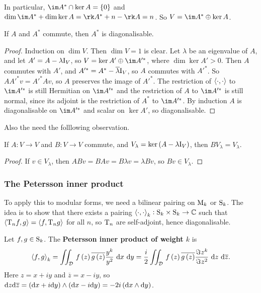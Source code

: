 In particular, $ \im A^* \cap \ker A = \cbr{0} $ and $ \dim \im A^* + \dim \ker A = \rk A^* + n - \rk A = n $. So $ V = \im A^* \oplus \ker A $.

\begin{theorem}
If $ A $ and $ A^* $ commute, then $ A^* $ is diagonalisable.
\end{theorem}

\begin{proof}
Induction on $ \dim V $. Then $ \dim V = 1 $ is clear. Let $ \lambda $ be an eigenvalue of $ A $, and let $ A' = A - \lambda\I_V $, so $ V = \ker A' \oplus \im A'^* $, where $ \dim \ker A' > 0 $. Then $ A $ commutes with $ A' $, and $ A'^* = A^* - \overline{\lambda} \I_V $, so $ A $ commutes with $ A'^* $. So $ AA'^*v = A'^*Av $, so $ A $ preserves the image of $ A'^* $. The restriction of $ \abr{\cdot, \cdot} $ to $ \im A'^* $ is still Hermitian on $ \im A'^* $ and the restriction of $ A $ to $ \im A'^* $ is still normal, since its adjoint is the restriction of $ A^* $ to $ \im A'^* $. By induction $ A $ is diagonalisable on $ \im A'^* $ and scalar on $ \ker A' $, so diagonalisable.
\end{proof}

Also the need the folllowing observation.

\begin{proposition}
If $ A : V \to V $ and $ B : V \to V $ commute, and $ V_\lambda = \ker \br{A - \lambda\I_V} $, then $ BV_\lambda = V_\lambda $.
\end{proposition}

\begin{proof}
If $ v \in V_\lambda $, then $ ABv = BAv = B\lambda v = \lambda Bv $, so $ Bv \in V_\lambda $.
\end{proof}

\subsubsection{The Petersson inner product}

To apply this to modular forms, we need a bilinear pairing on $ \M_k $ or $ \S_k $. The idea is to show that there exists a pairing $ \abr{\cdot, \cdot}_k : \S_k \times \S_k \to \CC $ such that $ \abr{\T_nf, g} = \abr{f, \T_ng} $ for all $ n $, so $ \T_n $ are self-adjoint, hence diagonalisable.

\begin{definition}
Let $ f, g \in \S_k $. The \textbf{Petersson inner product of weight $ k $} is
$$ \abr{f, g}_k = \iintd{\DDD}{f\br{z}\overline{g\br{z}}\dfrac{y^k}{y^2}}{x}{y} = \dfrac{i}{2}\iintd{\DDD}{f\br{z}\overline{g\br{z}}\dfrac{\Im z^k}{\Im z^2}}{z}{\overline{z}}. $$
Here $ z = x + iy $ and $ \overline{z} = x - iy $, so $ \d z\d\overline{z} = \br{\d x + i\d y} \wedge \br{\d x - i\d y} = -2i\br{\d x \wedge \d y} $.
\end{definition}

